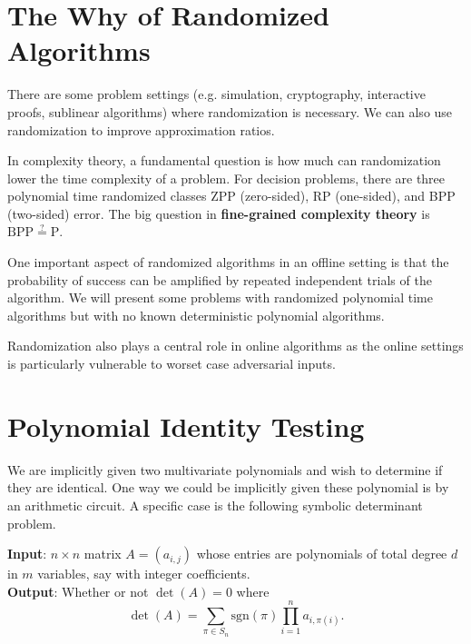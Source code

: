



\section{The Why of Randomized Algorithms}

There are some problem settings (e.g. simulation, cryptography, interactive proofs, sublinear algorithms) where randomization is necessary. We can also use randomization to improve approximation ratios.

In complexity theory, a fundamental question is how much can randomization lower the time complexity of a problem. For decision problems, there are three polynomial time randomized classes ZPP (zero-sided), RP (one-sided), and BPP (two-sided) error. The big question in \textbf{fine-grained complexity theory} is $\mathrm{BPP} \overset{?}{=} \mathrm{P}$.

One important aspect of randomized algorithms in an offline setting is that the probability of success can be amplified by repeated independent trials of the algorithm. We will present some problems with randomized polynomial time algorithms but with no known deterministic polynomial algorithms.

Randomization also plays a central role in online algorithms as the online settings is particularly vulnerable to worset case adversarial inputs.

\section{Polynomial Identity Testing}

We are implicitly given two multivariate polynomials and wish to determine if they are identical. One way we could be implicitly given these polynomial is by an arithmetic circuit. A specific case is the following symbolic determinant problem.

\begin{problem}
    \hfill

    \normalfont \textbf{Input}: $n \times n$ matrix $A = (a_{i,j})$ whose entries are polynomials of total degree $d$ in $m$ variables, say with integer coefficients. \\
    \normalfont \textbf{Output}: Whether or not $\det (A) = 0$ where
    $$
    \det (A) = \sum_{\pi \in S_n} {\mathrm{sgn}(\pi)} \prod_{i=1}^n a_{i,\pi(i)}.
    $$
\end{problem}


